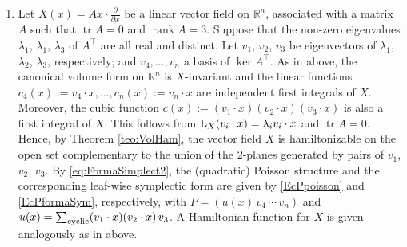 \documentclass[10pt,a4paper]{amsart}
\newcommand{\R}[1]{\mathbb{R}^{#1}}
\numberwithin{equation}{section}
\begin{document}
\begin{Example}
\begin{enumerate}
 \item Let $X (x) = Ax \cdot \frac{\partial}{\partial x}$ be a linear vector field on $\R{n}$, associated with a matrix $A$ such that $\operatorname{tr}A = 0$ and $\operatorname{rank}A = 3$. Suppose that the non-zero eigenvalues $\lambda_{1}$, $\lambda_{1}$, $\lambda_{3}$ of $A^{\top}$ are all real and distinct. Let $v_1$, $v_2$, $v_3$ be eigenvectors of $\lambda_1$, $\lambda_2$, $\lambda_3$, respectively; and $v_4,\dots,v_{n}$ a basis of $\ker{A}^{\top}$. As in above, the canonical volume form on $\R{n}$ is $X$-invariant and the linear functions $c_4(x) := v_4 \cdot x, \dots, c_{n}(x) := v_{n} \cdot x$ are independent first integrals of $X$. Moreover, the cubic function $c(x):=(v_1\cdot x)(v_2\cdot x)(v_3\cdot x)$ is also a first integral of $X$. This follows from ${\rm L}_{X}(v_i\cdot x) = \lambda_i v_i\cdot x$ and $\operatorname{tr}A = 0$. Hence, by Theorem \ref{teo:VolHam}, the vector field $X$ is hamiltonizable on the open set complementary to the union of the 2-planes generated by pairs of $v_1$, $v_2$, $v_3$. By \eqref{eq:FormaSimplect2}, the (quadratic) Poisson structure and the corresponding leaf-wise symplectic form are given by \eqref{EcPpoisson} and \eqref{EcPformaSym}, respectively, with $P = (u(x) \, v_{4} \,\cdots\, v_{n})$ and $u(x) = \sum_{{\rm cyclic}} (v_1 \cdot x)(v_2 \cdot x)\,v_3$. A Hamiltonian function for $X$ is given analogously as in above.


\end{enumerate}
\end{Example}
\end{document}
